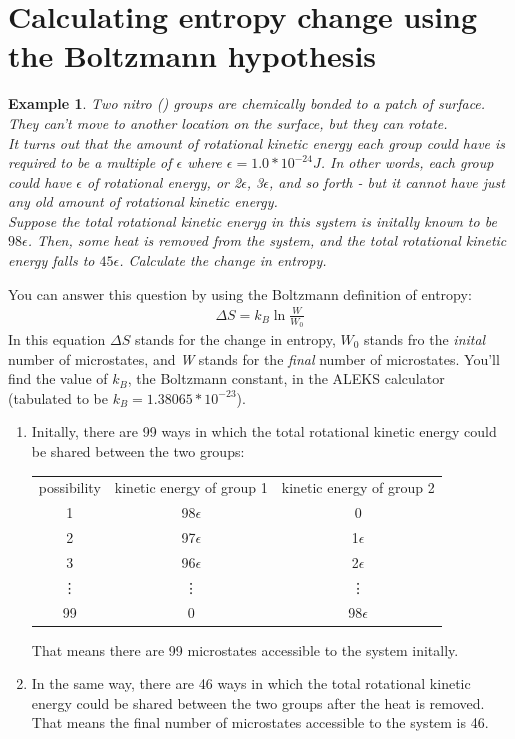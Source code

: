 \documentclass{article}  %
\newtheorem{exmp}{Example}
\begin{document}
\section*{Calculating entropy change using the Boltzmann hypothesis}
\begin{exmp}
    Two nitro () groups are chemically bonded to a patch of surface. They can't move to another location on the surface, but they can rotate. \\
    It turns out that the amount of rotational kinetic energy each  group could have is required to be a multiple of $\epsilon$ where $\epsilon = 1.0 * 10^{-24}J$. In other words, each  group could have $\epsilon$ of rotational energy, or 2$\epsilon$, 3$\epsilon$, and so forth - but it \emph{cannot} have just any old amount of rotational kinetic energy. \\
    Suppose the \emph{total} rotational kinetic eneryg in this system is initally known to be $98\epsilon$. Then, some heat is removed from the system, and the total rotational kinetic energy falls to $45\epsilon$. Calculate the change in entropy.
\end{exmp}
You can answer this question by using the Boltzmann definition of entropy:
\begin{equation*}
    \begin{aligned}
        \Delta S = k_B \ln \frac{W}{W_0}
    \end{aligned}
\end{equation*}
In this equation $\Delta S$ stands for the change in entropy, $W_0$ stands fro the \emph{inital} number of microstates, and \emph{W} stands for the \emph{final} number of microstates. You'll find the value of $k_B$, the Boltzmann constant, in the ALEKS calculator (tabulated to be $k_B = 1.38065*10^{-23}$).
\begin{enumerate}
    \item Initally, there are 99 ways in which the total rotational kinetic energy could be shared between the two  groups:
        \begin{center}
            \begin{tabular}{c | c | c}
                possibility & kinetic energy of group 1 & kinetic energy of group 2 \\
                1 & 98$\epsilon$ & 0 \\
                2 & 97$\epsilon$ & 1$\epsilon$ \\
                3 & 96$\epsilon$ & 2$\epsilon$ \\
                \vdots & \vdots & \vdots \\
                99 & 0 & 98$\epsilon$ \\
            \end{tabular}
        \end{center}
        That means there are 99 microstates accessible to the system initally.
    \item In the same way, there are 46 ways in which the total rotational kinetic energy could be shared between the two  groups after the heat is removed. \\
        That means the final number of microstates accessible to the system is 46.
\end{enumerate}
\end{document}
